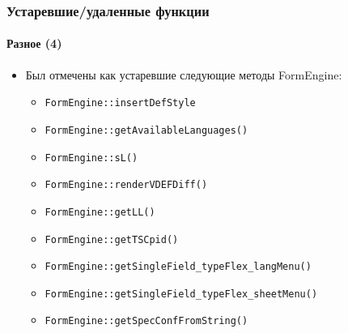 \begin{frame}[fragile]
	\frametitle{Устаревшие/удаленные функции}
	\framesubtitle{Разное (4)}

	\begin{itemize}
		\item Был отмечены как устаревшие следующие методы FormEngine:
		\begin{itemize}
			\item \texttt{FormEngine::insertDefStyle}
			\item \texttt{FormEngine::getAvailableLanguages()}
			\item \texttt{FormEngine::sL()}
			\item \texttt{FormEngine::renderVDEFDiff()}
			\item \texttt{FormEngine::getLL()}
 			\item \texttt{FormEngine::getTSCpid()}
 			\item \texttt{FormEngine::getSingleField\_typeFlex\_langMenu()}
 			\item \texttt{FormEngine::getSingleField\_typeFlex\_sheetMenu()}
 			\item \texttt{FormEngine::getSpecConfFromString()}
 		\end{itemize}
	\end{itemize}

\end{frame}

